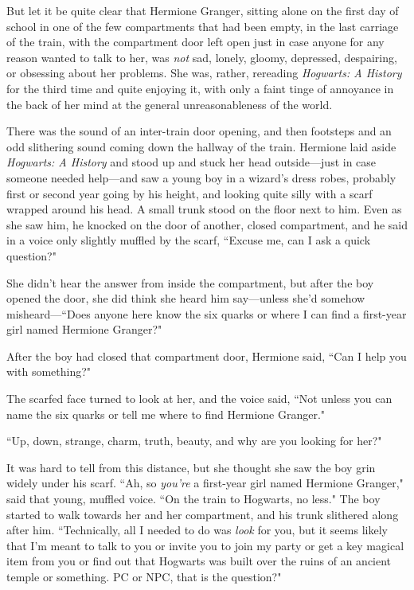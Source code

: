 But let it be quite clear that Hermione Granger, sitting alone on the first day of school in one of the few compartments that had been empty, in the last carriage of the train, with the compartment door left open just in case anyone for any reason wanted to talk to her, was \emph{not} sad, lonely, gloomy, depressed, despairing, or obsessing about her problems. She was, rather, rereading \emph{Hogwarts: A History} for the third time and quite enjoying it, with only a faint tinge of annoyance in the back of her mind at the general unreasonableness of the world.

There was the sound of an inter-train door opening, and then footsteps and an odd slithering sound coming down the hallway of the train. Hermione laid aside \emph{Hogwarts: A History} and stood up and stuck her head outside—just in case someone needed help—and saw a young boy in a wizard's dress robes, probably first or second year going by his height, and looking quite silly with a scarf wrapped around his head. A small trunk stood on the floor next to him. Even as she saw him, he knocked on the door of another, closed compartment, and he said in a voice only slightly muffled by the scarf, ``Excuse me, can I ask a quick question?"

She didn't hear the answer from inside the compartment, but after the boy opened the door, she did think she heard him say—unless she'd somehow misheard—``Does anyone here know the six quarks or where I can find a first-year girl named Hermione Granger?"

After the boy had closed that compartment door, Hermione said, ``Can I help you with something?"

The scarfed face turned to look at her, and the voice said, ``Not unless you can name the six quarks or tell me where to find Hermione Granger."

``Up, down, strange, charm, truth, beauty, and why are you looking for her?"

It was hard to tell from this distance, but she thought she saw the boy grin widely under his scarf. ``Ah, so \emph{you're} a first-year girl named Hermione Granger," said that young, muffled voice. ``On the train to Hogwarts, no less." The boy started to walk towards her and her compartment, and his trunk slithered along after him. ``Technically, all I needed to do was \emph{look} for you, but it seems likely that I'm meant to talk to you or invite you to join my party or get a key magical item from you or find out that Hogwarts was built over the ruins of an ancient temple or something. PC or NPC, that is the question?"

